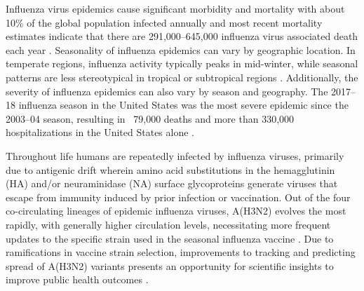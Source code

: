 Influenza virus epidemics cause significant morbidity and mortality with about 10\% of the global population infected annually \citep{WHO_influenza_factsheet} and most recent mortality estimates indicate that there are 291,000--645,000 influenza virus associated death each year \citep{iuliano2018estimates}.
Seasonality of influenza epidemics can vary by geographic location.
In temperate regions, influenza activity typically peaks in mid-winter, while seasonal patterns are less stereotypical in tropical or subtropical regions \citep{petrova_evolution_2018}.
Additionally, the severity of influenza epidemics can also vary by season and geography.
The 2017--18 influenza season in the United States was the most severe epidemic since the 2003--04 season, resulting in ~79,000 deaths and more than 330,000 hospitalizations in the United States alone \citep{garten2018update}.

Throughout life humans are repeatedly infected by influenza viruses, primarily due to antigenic drift wherein amino acid substitutions in the hemagglutinin (HA) and/or neuraminidase (NA) surface glycoproteins generate viruses that escape from immunity induced by prior infection or vaccination.
Out of the four co-circulating lineages of epidemic influenza viruses, A(H3N2) evolves the most rapidly, with generally higher circulation levels, necessitating more frequent updates to the specific strain used in the seasonal influenza vaccine \citep{bedford_integrating_2014, hay2001evolution}.
Due to ramifications in vaccine strain selection, improvements to tracking and predicting spread of A(H3N2) variants presents an opportunity for scientific insights to improve public health outcomes \citep{morris_predictive_2017}.

